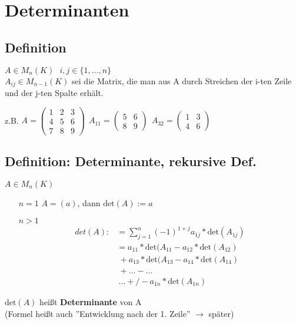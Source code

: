 
\section{Determinanten}

\subsection{Definition}
$A\in M_n(K) \ \ \ i,j\in\lbrace 1,\dots,n\rbrace$\\
$A_{ij}\in M_{n-1}(K)$ sei die Matrix, die man aus A durch Streichen der i-ten Zeile und der j-ten Spalte erhält.

z.B. $A=\begin{pmatrix}1 & 2 & 3 \\ 4 & 5 & 6 \\  7 & 8 & 9\end{pmatrix} \ \ A_{11}=\begin{pmatrix}5 & 6 \\ 8 & 9\end{pmatrix} \ \ A_{32}=\begin{pmatrix}1 & 3 \\ 4 & 6\end{pmatrix}$

\subsection{Definition: Determinante, rekursive Def.}
$A\in M_n(K)$
\begin{itemize}
	\item[$n=1$] $A=(a)$, dann $\mathrm{det}(A):=a$
	\item[$n>1$] \begin{align*}
	{det}(A):&=\sum_{j=1}^n (-1)^{1+j}a_{1j}*\mathrm{det}(A_{1j})\\
	&=a_{11}*\mathrm{det}(A_{11}-a_{12}*\mathrm{det}(A_{12})\\
	& \ +a_{13}*\mathrm{det}(A_{13}-a_{14}*\mathrm{det}(A_{14})\\
	& \ +\dots -\dots\\
	& \ \dots +/- a_{1n}*\mathrm{det}(A_{1n})
	\end{align*}
\end{itemize}
$\mathrm{det}(A)$ heißt \textbf{Determinante} von A\\
(Formel heißt auch ''Entwicklung nach der 1. Zeile'' $\rightarrow$ später)

